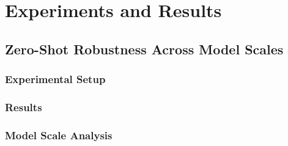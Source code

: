 
\chapter{Experiments and Results}
\label{ch:experiments}


\section{Zero-Shot Robustness Across Model Scales}
\label{sec:zero_shot}


\subsection{Experimental Setup}
\label{sec:zs_setup}


\subsection{Results}
\label{sec:zs_results}


\subsection{Model Scale Analysis}
\label{sec:zs_scale}


